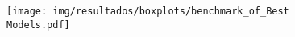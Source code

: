 \begin{figure}[h!]
	\texttt{[image: img/resultados/boxplots/benchmark\_of\_Best Models.pdf]}
	\caption{}
	\label{fig:Time_of_Best Models}
\end{figure}
